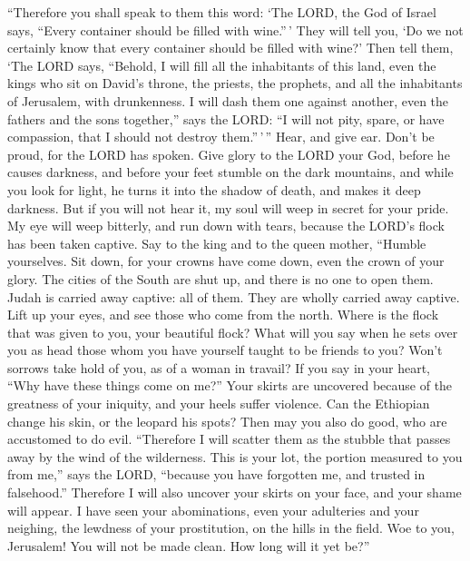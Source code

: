  ``Therefore you shall speak to them this word: `The LORD,
the God of Israel says, ``Every container should be filled with
wine.''\,' They will tell you, `Do we not certainly know that every
container should be filled with wine?'  Then tell them,
`The LORD says, ``Behold, I will fill all the inhabitants of this land,
even the kings who sit on David's throne, the priests, the prophets, and
all the inhabitants of Jerusalem, with drunkenness.  I will
dash them one against another, even the fathers and the sons together,''
says the LORD: ``I will not pity, spare, or have compassion, that I
should not destroy them.''\,'\,''  Hear, and give ear.
Don't be proud, for the LORD has spoken.  Give glory to the
LORD your God, before he causes darkness, and before your feet stumble
on the dark mountains, and while you look for light, he turns it into
the shadow of death, and makes it deep darkness.  But if
you will not hear it, my soul will weep in secret for your pride. My eye
will weep bitterly, and run down with tears, because the LORD's flock
has been taken captive.  Say to the king and to the queen
mother, ``Humble yourselves. Sit down, for your crowns have come down,
even the crown of your glory.  The cities of the South are
shut up, and there is no one to open them. Judah is carried away
captive: all of them. They are wholly carried away captive.
 Lift up your eyes, and see those who come from the north.
Where is the flock that was given to you, your beautiful flock?
 What will you say when he sets over you as head those whom
you have yourself taught to be friends to you? Won't sorrows take hold
of you, as of a woman in travail?  If you say in your
heart, ``Why have these things come on me?'' Your skirts are uncovered
because of the greatness of your iniquity, and your heels suffer
violence.  Can the Ethiopian change his skin, or the
leopard his spots? Then may you also do good, who are accustomed to do
evil.  ``Therefore I will scatter them as the stubble that
passes away by the wind of the wilderness.  This is your
lot, the portion measured to you from me,'' says the LORD, ``because you
have forgotten me, and trusted in falsehood.''  Therefore I
will also uncover your skirts on your face, and your shame will appear.
 I have seen your abominations, even your adulteries and
your neighing, the lewdness of your prostitution, on the hills in the
field. Woe to you, Jerusalem! You will not be made clean. How long will
it yet be?''

